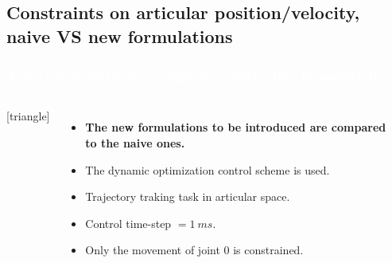 \subsection{Constraints on articular position/velocity, naive VS new formulations}
\begin{frame}
\frametitle{{\textcolor{white}{\hspace{0.2cm}Test case scenario for comparing constraints formulations}}}
 
\begin{columns}
\column{\dimexpr\paperwidth-4pt}
    
[triangle]    
\begin{itemize}
\addtolength{\itemindent}{1mm}
\item \textbf{The new formulations to be introduced are compared to the naive ones.}
\item The dynamic optimization control scheme is used.
\item Trajectory traking task in articular space.
\item Control time-step $= 1~ms$.
\item Only the movement of joint $0$ is constrained.
\end{itemize}    
\vspace{5mm}
\begin{columns}
\column{.55\paperwidth}



\begin{center}

\vspace{-15mm}
\hspace{5mm}



\end{center}
\end{columns}
\end{columns}
\end{frame}
